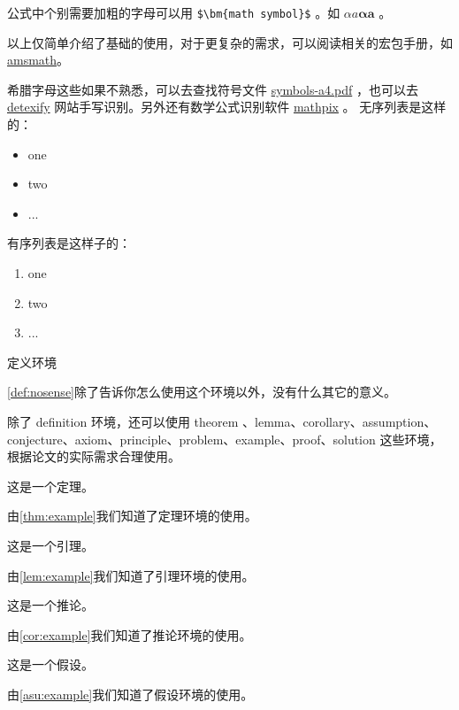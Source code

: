 公式中个别需要加粗的字母可以用 \verb|$\bm{math symbol}$| 。如 $ \alpha a\bm{\alpha a} $ 。

以上仅简单介绍了基础的使用，对于更复杂的需求，可以阅读相关的宏包手册，如 \href{http://texdoc.net/texmf-dist/doc/latex/amsmath/amsldoc.pdf}{amsmath}。

希腊字母这些如果不熟悉，可以去查找符号文件 \href{http://mirrors.ctan.org/info/symbols/comprehensive/symbols-a4.pdf}{symbols-a4.pdf} ，也可以去 \href{http://detexify.kirelabs.org/classify.html}{detexify} 网站手写识别。另外还有数学公式识别软件 \href{https://mathpix.com/}{mathpix} 。
无序列表是这样的：
\begin{itemize}
	\item one
	\item two
	\item ...
\end{itemize}

有序列表是这样子的：
\begin{enumerate}
	\item one
	\item two
	\item ...
\end{enumerate}

\begin{definition}
	定义环境
	\label{def:nosense}
\end{definition}
\cref{def:nosense}除了告诉你怎么使用这个环境以外，没有什么其它的意义。

除了 definition 环境，还可以使用 theorem 、lemma、corollary、assumption、conjecture、axiom、principle、problem、example、proof、solution 这些环境，根据论文的实际需求合理使用。

\begin{theorem}
	这是一个定理。
	\label{thm:example}
\end{theorem}
由\cref{thm:example}我们知道了定理环境的使用。

\begin{lemma}
	这是一个引理。
	\label{lem:example}
\end{lemma}
由\cref{lem:example}我们知道了引理环境的使用。

\begin{corollary}
	这是一个推论。
	\label{cor:example}
\end{corollary}
由\cref{cor:example}我们知道了推论环境的使用。

\begin{assumption}
	这是一个假设。
	\label{asu:example}
\end{assumption}
由\cref{asu:example}我们知道了假设环境的使用。

